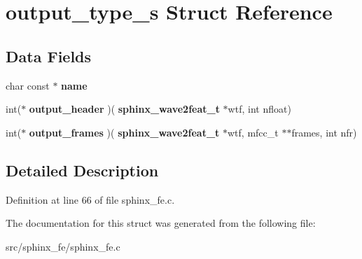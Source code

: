 \section{output\+\_\+type\+\_\+s Struct Reference}
\label{structoutput__type__s}
\subsection*{Data Fields}
\begin{DoxyCompactItemize}
\item 
\mbox{\label{structoutput__type__s_a978f479360a30a64f9e151d75ec2bb4b}} 
char const  $\ast$ {\bfseries name}
\item 
\mbox{\label{structoutput__type__s_a150ba92b9d82aabb8e0087894ef5dba9}} 
int($\ast$ {\bfseries output\+\_\+header} )(\textbf{ sphinx\+\_\+wave2feat\+\_\+t} $\ast$wtf, int nfloat)
\item 
\mbox{\label{structoutput__type__s_a2d46cc2b8de8a884037052bb271af232}} 
int($\ast$ {\bfseries output\+\_\+frames} )(\textbf{ sphinx\+\_\+wave2feat\+\_\+t} $\ast$wtf, mfcc\+\_\+t $\ast$$\ast$frames, int nfr)
\end{DoxyCompactItemize}


\subsection{Detailed Description}


Definition at line 66 of file sphinx\+\_\+fe.\+c.



The documentation for this struct was generated from the following file\+:\begin{DoxyCompactItemize}
\item 
src/sphinx\+\_\+fe/sphinx\+\_\+fe.\+c\end{DoxyCompactItemize}
